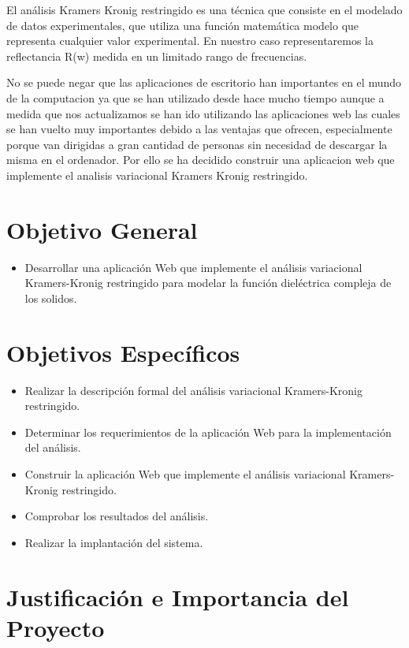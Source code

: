 \documentclass[a4paper,openright,12pt]{book}
\begin{document}
El análisis Kramers Kronig restringido es una técnica que consiste en el modelado de datos experimentales, que utiliza una función matemática modelo que representa cualquier valor experimental. En nuestro caso representaremos la reflectancia R(w) medida en un limitado rango de frecuencias. 

No se puede negar que las aplicaciones de escritorio han importantes en el mundo de la computacion ya que se han utilizado desde hace mucho tiempo aunque a medida que nos actualizamos se han ido utilizando las aplicaciones web las cuales se han vuelto muy importantes debido a las ventajas que ofrecen, especialmente porque van dirigidas a gran cantidad de personas sin necesidad de descargar la misma en el ordenador.
Por ello se ha decidido construir una aplicacion web que implemente el analisis variacional Kramers Kronig restringido.


\section{Objetivo General}

\begin{itemize}
\item Desarrollar una aplicación Web que implemente el análisis variacional Kramers-Kronig restringido para modelar la función dieléctrica compleja de los solidos.
\end{itemize}

\section{Objetivos Específicos}
\begin{itemize}
\item Realizar la descripción formal del análisis variacional Kramers-Kronig restringido.
\item Determinar los requerimientos de la aplicación Web para la implementación del análisis.
\item Construir la aplicación Web que implemente el análisis variacional Kramers-Kronig restringido.
\item Comprobar los resultados del análisis.
\item Realizar la implantación del sistema.
\end{itemize}


\section{Justificación e Importancia del Proyecto}
\end{document}
